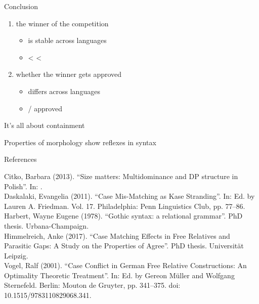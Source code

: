 \documentclass[xcolor=dvipsnames,10pt]{beamer}
\begin{document}
\begin{frame}[t]{Conclusion}

  \begin{enumerate}
    \item the winner of the competition
    \begin{itemize}
        \item is stable across languages
        \item {} <  < 
    \end{itemize}
    \item whether the winner gets approved
    \begin{itemize}
        \item differs across languages
        \item {}/ approved
    \end{itemize}
  \end{enumerate}

  \pause

\vspace{1em}

It's all about containment

  \pause

  \vspace{1em}

Properties of morphology show reflexes in syntax

\end{frame}


\begin{frame}[t]{References}

Citko, Barbara (2013). “Size matters: Multidominance and DP structure in Polish”. In: .\\
Daskalaki, Evangelia (2011). “Case Mis-Matching as Kase Stranding”. In:  Ed. by Lauren A. Friedman. Vol. 17. Philadelphia: Penn Linguistics Club, pp. 77–86.\\
Harbert, Wayne Eugene (1978). “Gothic syntax: a relational grammar”. PhD thesis. Urbana-Champaign.\\
Himmelreich, Anke (2017). “Case Matching Effects in Free Relatives and Parasitic Gaps: A Study on the Properties of Agree”. PhD thesis. Universität Leipzig.\\
Vogel, Ralf (2001). “Case Conflict in German Free Relative Constructions: An Optimality Theoretic Treatment”. In:  Ed. by Gereon Müller and Wolfgang Sternefeld. Berlin: Mouton de Gruyter, pp. 341–375. doi: 10.1515/9783110829068.341.

\end{frame}
\end{document}
